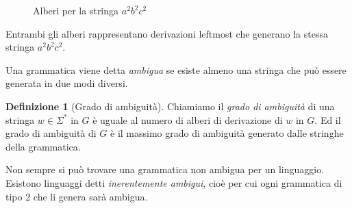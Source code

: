 \documentclass[12pt]{report}
\theoremstyle{definition}
\newtheorem{definizione}{Definizione}
\theoremstyle{regard}
\begin{document}
\begin{figure}[H]
	\centering
	\begin{subfigure}{.45\textwidth}
	\end{subfigure}
	\begin{subfigure}{.45\textwidth}
	\end{subfigure}
	\caption{Alberi per la stringa $a^2 b^2 c^2$}
\end{figure}
Entrambi gli alberi rappresentano derivazioni leftmost che generano la stessa stringa $a^2 b^2 c^2$. %

Una grammatica viene detta \textit{ambigua} se esiste almeno una stringa che può essere generata in due modi diversi.
\begin{definizione}[Grado di ambiguità]
	Chiamiamo il \textit{grado di ambiguità} di una stringa $w \in \Sigma^*$ in $G$ è uguale al numero di alberi di derivazione di $w$ in $G$.
	Ed il grado di ambiguità di $G$ è il massimo grado di ambiguità generato dalle stringhe della grammatica.
\end{definizione}

Non sempre si può trovare una grammatica non ambigua per un linguaggio.
Esistono linguaggi detti \textit{inerentemente ambigui}, cioè per cui ogni grammatica di tipo 2 che li genera sarà ambigua.
\end{document}
